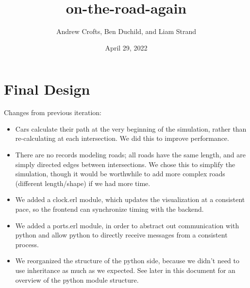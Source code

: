 \documentclass{article}
\title{on-the-road-again}
\author{Andrew Crofts, Ben Duchild, and Liam Strand}
\date{April 29, 2022}
\begin{document}
\maketitle

\section{Final Design}

\noindent{}

\noindent Changes from previous iteration:
\begin{itemize}
	\item Cars calculate their path at the very beginning of the simulation, rather than re-calculating at each intersection. We did this to improve performance.
	\item There are no records modeling roads; all roads have the same length, and are simply directed edges between intersections. We chose this to simplify the simulation, though it would be worthwhile to add more complex roads (different length/shape) if we had more time.
	\item We added a clock.erl module, which updates the visualization at a consistent pace, so the frontend can synchronize timing with the backend. 
	\item We added a ports.erl module, in order to abstract out communication with python and allow python to directly receive messages from a consistent process. 
	\item We reorganized the structure of the python side, because we didn't need to use inheritance as much as we expected. See later in this document for an overview of the python module structure.

\end{itemize}
\end{document}
